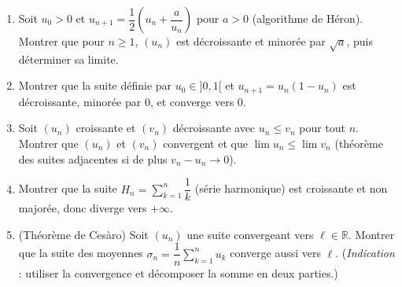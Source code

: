 \vspace{6pt}
\exolabel

\begin{mdframed}[style=exobar]
  \begin{enumerate}
    \item Soit $u_0 > 0$ et $u_{n+1} = \dfrac{1}{2}\!\left(u_n +
          \dfrac{a}{u_n}\right)$ pour $a > 0$ (algorithme de Héron). Montrer
          que pour $n \geq 1$, $(u_n)$ est décroissante et minorée par
          $\sqrt{a}$, puis déterminer sa limite.

    \item Montrer que la suite définie par $u_0 \in {]0,1[}$ et
          $u_{n+1} = u_n(1 - u_n)$ est décroissante, minorée par $0$,
          et converge vers $0$.

    \item Soit $(u_n)$ croissante et $(v_n)$ décroissante avec $u_n \leq v_n$
          pour tout $n$. Montrer que $(u_n)$ et $(v_n)$ convergent et que
          $\lim u_n \leq \lim v_n$ (théorème des suites adjacentes si de plus
          $v_n - u_n \to 0$).

    \item Montrer que la suite $H_n = \sum_{k=1}^{n} \dfrac{1}{k}$ (série
          harmonique) est croissante et non majorée, donc diverge vers
          $+\infty$.

    \item (Théorème de Cesàro) Soit $(u_n)$ une suite convergeant vers
          $\ell \in \mathbb{R}$. Montrer que la suite des moyennes
          $\sigma_n = \dfrac{1}{n}\sum_{k=1}^{n} u_k$ converge aussi vers
          $\ell$. (\emph{Indication} : utiliser la convergence et décomposer
          la somme en deux parties.)
  \end{enumerate}
\end{mdframed}

